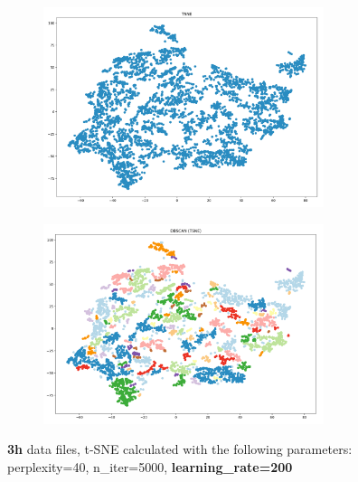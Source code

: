 \begin{figure}[H]
	\centering
	
  \centering
	\begin{subfigure}{.5\textwidth}
    \centering
    \includegraphics[width=0.9\textwidth]{./images/tsneParametersTest/learningRate/lr200-3hTSNE.png}
  \end{subfigure}%
  \begin{subfigure}{.5\textwidth}
    \centering
    \includegraphics[width=0.9\textwidth]{./images/tsneParametersTest/learningRate/lr200-3hDBSCAN.png}
	\end{subfigure}
	\caption{\textbf{3h} data files, t-SNE calculated with the following parameters: perplexity=40, n\_iter=5000, \textbf{learning\_rate=200}}
  \label{figure:3hlr200TSNE}
\end{figure}


